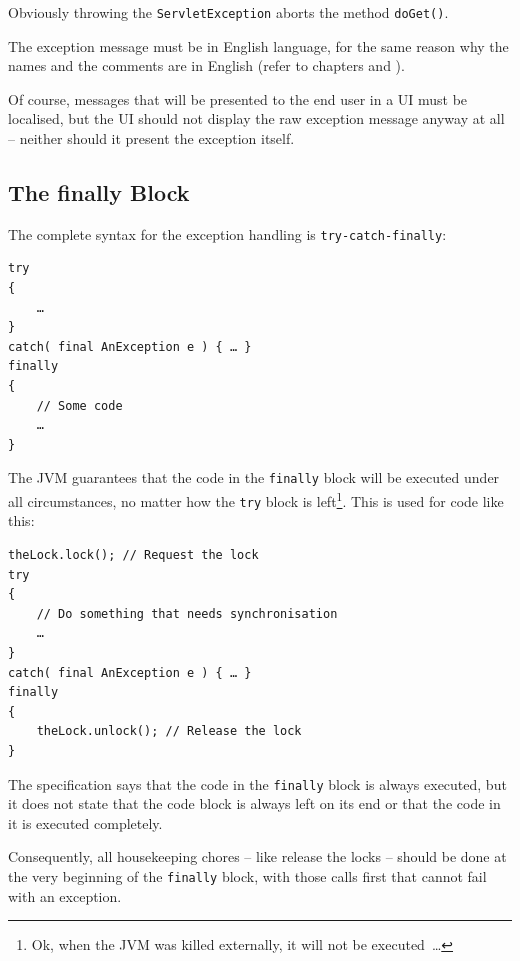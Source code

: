 Obviously throwing the \lstinline|ServletException| aborts the method \lstinline|doGet()|.

The exception message must be in English language, for the same reason why the names and the comments are in English (refer to chapters  and ).

Of course, messages that will be presented to the end user in a UI must be localised, but the UI should not display the raw exception message anyway at all – neither should it present the exception itself.


\subsection{The finally Block}\label{sec:FinallyBlock}
The complete syntax for the exception handling is \texttt{try-catch-finally}:
\begin{lstlisting}
try
{
    …
}
catch( final AnException e ) { … }
finally
{
    // Some code
    …
}
\end{lstlisting}
The JVM guarantees that the code in the \lstinline|finally| block will be executed under all circumstances, no matter how the \lstinline|try| block is left\footnote{Ok, when the JVM was killed externally, it will not be executed~…}. This is used for code like this:
\begin{lstlisting}
theLock.lock(); // Request the lock
try
{
    // Do something that needs synchronisation
    …
}
catch( final AnException e ) { … }
finally
{
    theLock.unlock(); // Release the lock
}
\end{lstlisting}

The specification \autocite{ORACLE_DOC_LANGUAGE_SPECIFICATION:TryCatchFinally} says that the code in the \lstinline|finally| block is always executed, but it does not state that the code block is always left on its end or that the code in it is executed completely.

Consequently, all housekeeping chores – like release the locks – should be done at the very beginning of the \lstinline|finally| block, with those calls first that cannot fail with an exception.

